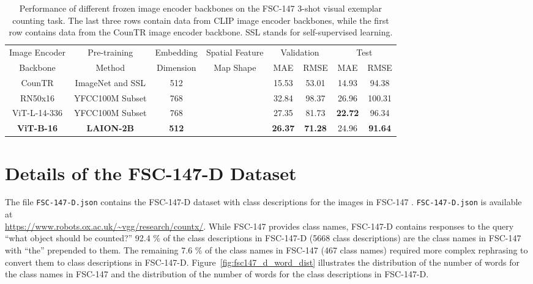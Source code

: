 \documentclass{bmvc2k}
\begin{document}
\begin{table}[h!]
\scriptsize
\begin{tabular}{|c|c|c|c|c|c|c|c|} 
  \hline
  Image Encoder & Pre-training & Embedding & Spatial Feature & \multicolumn{2}{|c|}{Validation} & \multicolumn{2}{|c|}{Test} \\
   Backbone &  Method &  Dimension &  Map Shape & MAE & RMSE & MAE & RMSE \\
   \hline
   CounTR \cite{Liu2022CounTRTG} & ImageNet and SSL & 512 &  & 15.53 & 53.01 & 14.93 & 94.38 \\
   \hline
   RN50x16 \cite{ilharco_gabriel_2021_5143773} & YFCC100M Subset \cite{Radford2021LearningTV} & 768 &  & 32.84 & 98.37 & 26.96 & 100.31\\
   ViT-L-14-336 \cite{ilharco_gabriel_2021_5143773} & YFCC100M Subset \cite{Radford2021LearningTV} & 768 &  & 27.35 & 81.73 & \textbf{22.72} & 96.34\\
   \textbf{ViT-B-16 \cite{ilharco_gabriel_2021_5143773}} & \textbf{LAION-2B \cite{schuhmann2022laionb}} & \textbf{512} &  & \textbf{26.37} & \textbf{71.28} & 24.96 & \textbf{91.64}\\
  \hline
 \end{tabular}
 \caption{\label{backbone} Performance of different frozen image encoder backbones on the FSC-147 \cite{m_Ranjan-etal-CVPR21} 3-shot visual exemplar counting task. The last three rows contain data from CLIP image encoder backbones, while the first row contains data from the CounTR image encoder backbone. SSL stands for self-supervised learning.}
 \end{table}

\newpage \section{Details of the FSC-147-D Dataset}
\label{sec:fsc-147-d}
The file \texttt{FSC-147-D.json} contains the FSC-147-D dataset with class descriptions for the images in FSC-147 \cite{m_Ranjan-etal-CVPR21}. \texttt{FSC-147-D.json} is available at \\ \href{https://www.robots.ox.ac.uk/~vgg/research/countx/}{https://www.robots.ox.ac.uk/\textasciitilde vgg/research/countx/}.
While FSC-147 provides class names, FSC-147-D contains responses to the query ``what object should be counted?'' 92.4 \% of the class descriptions in FSC-147-D (5668 class descriptions) are the class names in FSC-147 with ``the'' prepended to them. The remaining 7.6 \% of the class names in FSC-147 (467 class names) required more complex rephrasing to convert them to class descriptions in FSC-147-D. Figure~\ref{fig:fsc147_d_word_dist} illustrates the distribution of the number of words for the class names in FSC-147 and the distribution of the number of words for the class descriptions in FSC-147-D.
\end{document}
